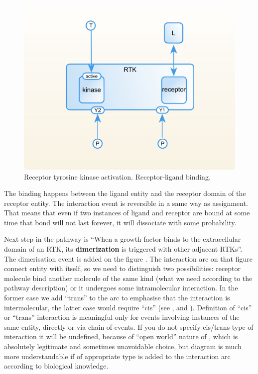 \begin{figure}[H]
  \centering
  \vspace*{-0.75em}
  \includegraphics[scale=0.75]{examples/rtk-binding.png}
   \caption{Receptor tyrosine kinase activation. Receptor-ligand binding.}
  \label{fig:rtk-binding}
\end{figure}

The binding happens between the ligand entity and the receptor domain of the receptor entity. The interaction event is reversible in a same way as assignment. That means that even if two instances of ligand and receptor are bound at some time that bond will not last forever, it will dissociate with some probability.

Next step in the pathway is ``When a growth factor binds to the extracellular domain of an RTK, its \textbf{dimerization} is triggered with other adjacent RTKs''. The dimerisation event is added on the figure . The interaction arc on that figure connect entity with itself, so we need to distinguish two possibilities: receptor molecule bind another molecule of the same kind (what we need according to the pathway description) or it undergoes some intramolecular interaction. In the former case we add  ``trans'' to the arc to emphasise that the interaction is intermolecular, the latter case would require  ``cis'' (see ,  and ). Definition of ``cis'' or ``trans'' interaction is meaningful only for events involving instances of the same entity, directly or via chain of events. If you do not specify cis/trans type of interaction it will be undefined, because of ``open world'' nature of \SBGNERLone, which is absolutely legitimate and sometimes unavoidable choice, but diagram is much more understandable if  of appropriate type is added to the interaction arc according to biological knowledge.

